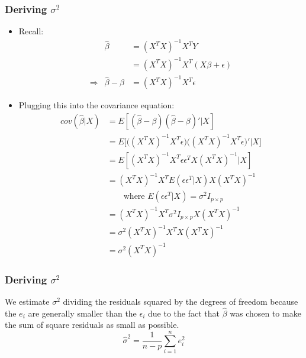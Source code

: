 \documentclass{beamer}
\begin{document}
\begin{frame}[t]\frametitle{Deriving $\sigma^2$}
	\begin{itemize}
		\item<+-> Recall:				
			\[ \begin{array}{rrl} & \hat{\beta} &= (X^{T}X)^{-1}X^{T}Y \nonumber \\
			& &= (X^{T}X)^{-1}X^{T}(X\beta + \epsilon) \\
			\Rightarrow & \hat{\beta} - \beta &= (X^{T}X)^{-1}X^{T} \epsilon
			\end{array} \]
			\item<+-> Plugging this into the covariance equation:
			\[ \begin{array}{rl}
			cov(\hat{\beta} | X) &= E[(\hat{\beta} - \beta)(\hat{\beta} - \beta)'|X] \\
			 &= E\big[ \big((X^{T}X)^{-1}X^{T}\epsilon \big) \big((X^{T}X)^{-1}X^{T}\epsilon)' | X\big] \\
			 &= E[ (X^{T}X)^{-1}X^{T} \epsilon \epsilon^{T}X(X^{T}X)^{-1} | X] \\
			 &= (X^{T}X)^{-1}X^{T} E(\epsilon\epsilon^{T} | X) X(X^{T}X)^{-1}  \\
			 &\qquad \text{where } E(\epsilon\epsilon^{T} | X) = \sigma^{2} I_{p \times p} \\
			 &= (X^{T}X)^{-1}X^{T} \sigma^{2} I_{p \times p} X(X^{T}X)^{-1} \\
			&= \sigma^{2} (X^{T}X)^{-1}X^{T}X(X^{T}X)^{-1} \\
			&= \sigma^{2} (X^{T}X)^{-1}
			\end{array} \]
	\end{itemize}
	\end{frame}
	
	\begin{frame}[t]\frametitle{Deriving $\sigma^2$}
		We estimate $\sigma^2$ dividing the residuals squared by the degrees of freedom because the $e_{i}$ are generally smaller than the $\epsilon_{i}$ due to the fact that $\hat{\beta}$ was chosen to make the sum of square residuals as small as possible.
		\[ \hat{\sigma}^2 = \frac{1}{n-p}\sum_{i = 1}^{n} e_{i}^2 \]
	\end{frame}
\end{document}
